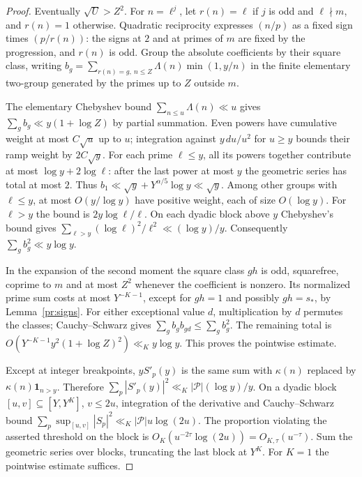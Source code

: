 \begin{proof}
Eventually \(\sqrt U>Z^2\). For \(n=\ell^j\), let \(r(n)=\ell\) if
\(j\) is odd and \(\ell\nmid m\), and \(r(n)=1\) otherwise. Quadratic
reciprocity expresses \((n/p)\) as a fixed sign times \((p/r(n))\):
the signs at \(2\) and at primes of \(m\) are fixed by the progression,
and \(r(n)\) is odd. Group the absolute coefficients by their square
class, writing \(b_g=\sum_{r(n)=g,\ n\le Z}\Lambda(n)\min(1,y/n)\)
in the finite elementary two-group generated by the primes up to \(Z\)
outside \(m\).

The elementary Chebyshev bound \(\sum_{n\le u}\Lambda(n)\ll u\)
gives \(\sum_g b_g\ll y(1+\log Z)\) by partial summation.
Even powers have cumulative weight at most \(C\sqrt u\) up to \(u\);
integration against \(y\,du/u^2\) for \(u\ge y\) bounds their ramp
weight by \(2C\sqrt y\). For each prime \(\ell\le y\), all its powers
together contribute at most \(\log y+2\log\ell\): after the last power
at most \(y\) the geometric series has total at most \(2\).
Thus \(b_1\ll\sqrt y+Y^{\alpha/5}\log y\ll\sqrt y\).
Among other groups with \(\ell\le y\), at most \(O(y/\log y)\) have
positive weight, each of size \(O(\log y)\). For \(\ell>y\) the bound
is \(2y\log\ell/\ell\). On each dyadic block above \(y\) Chebyshev's
bound gives \(\sum_{\ell>y}(\log\ell)^2/\ell^2\ll(\log y)/y\).
Consequently \(\sum_g b_g^2\ll y\log y\).

In the expansion of the second moment the square class \(gh\) is odd,
squarefree, coprime to \(m\) and at most \(Z^2\) whenever the coefficient
is nonzero. Its normalized prime sum costs at most \(Y^{-K-1}\), except
for \(gh=1\) and possibly \(gh=s_*\), by Lemma~\ref{pr:signs}.
For either exceptional value \(d\), multiplication by \(d\) permutes
the classes; Cauchy--Schwarz gives \(\sum_g b_g b_{gd}\le\sum_g b_g^2\).
The remaining total is \(O(Y^{-K-1}y^2(1+\log Z)^2)\ll_K y\log y\).
This proves the pointwise estimate.

Except at integer breakpoints, \(y S'_p(y)\) is the same sum with
\(\kappa(n)\) replaced by \(\kappa(n)\mathbf1_{n>y}\). Therefore
\(\sum_p|S'_p(y)|^2\ll_K|\mathcal P|(\log y)/y\).
On a dyadic block \([u,v]\subseteq[Y,Y^K]\), \(v\le2u\), integration
of the derivative and Cauchy--Schwarz bound
\(\sum_p\sup_{[u,v]}|S_p|^2\ll_K|\mathcal P|u\log(2u)\).
The proportion violating the asserted threshold on the block is
\(O_K(u^{-2\tau}\log(2u))=O_{K,\tau}(u^{-\tau})\). Sum the geometric
series over blocks, truncating the last block at \(Y^K\). For \(K=1\)
the pointwise estimate suffices.
\end{proof}

